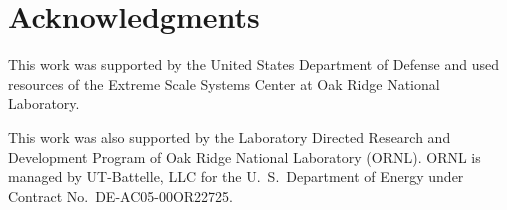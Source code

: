 \section*{Acknowledgments}

This work was supported by the United States Department of Defense
and used resources of the Extreme Scale Systems Center at Oak Ridge
National Laboratory.

This work was also supported by the Laboratory Directed Research and
Development Program of Oak Ridge National Laboratory (ORNL). ORNL is
managed by UT-Battelle, LLC for the U.~S.~Department of Energy under
Contract No.~DE-AC05-00OR22725.

